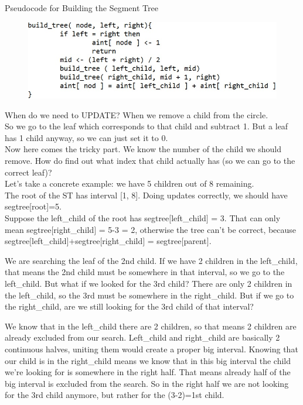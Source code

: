 \documentclass{article}
\begin{document}
Pseudocode for Building the Segment Tree

\begin{figure}[h!]
\includegraphics[scale=0.7]{pseudocod_build_st.jpg}
\end{figure}


When  do  we  need  to  UPDATE?  When  we  remove  a  child  from  the  circle.  
\\So  we  go  to  the  leaf  which  corresponds  to  that  child  and  subtract  1.  But  a  leaf  has  1  child  anyway,  so  we  can  just  set  it  to  0.  
\\Now  here  comes  the  tricky  part.  We  know  the  number  of  the  child  we  should  remove.  How  do  find  out  what  index  that  child  actually  has  (so  we  can  go  to  the  correct  leaf)?   
\\Let’s  take  a  concrete  example:  we  have  5  children  out  of  8  remaining.  
\\The  root  of  the  ST  has  interval  [1,  8].  Doing  updates  correctly,  we  should  have  segtree[root]=5.  
\\Suppose  the  left\_child  of  the  root  has  segtree$[$left\_child$]$ = 3. That  can  only  mean  segtree$[$right\_child$]$ = 5-3 = 2,  otherwise  the  tree  can’t  be  correct,  because  segtree$[$left\_child$]$+segtree$[$right\_child$]$ = segtree$[$parent$]$.


We  are  searching  the  leaf  of  the  2nd  child.  If  we  have  2  children  in  the  left\_child,  that  means  the  2nd  child  must  be  somewhere  in  that  interval,  so  we  go  to  the  left\_child.  But  what  if  we  looked  for  the  3rd  child?  There  are  only  2  children  in  the  left\_child,  so  the  3rd  must  be  somewhere  in  the  right\_child.  But if we go to the  right\_child,  are  we  still  looking  for  the  3rd  child  of  that  interval?  


We  know  that  in  the  left\_child  there  are  2  children,  so  that  means  2  children  are  already  excluded  from  our  search.  Left\_child  and  right\_child  are  basically  2  continuous  halves,  uniting  them  would  create  a  proper  big  interval.  Knowing  that  our  child  is  in  the  right\_child  means  we  know  that  in  this  big  interval  the  child  we’re  looking  for  is  somewhere  in  the  right  half.  That  means  already  half  of  the  big  interval  is  excluded  from  the  search.  So  in  the  right  half  we  are  not  looking  for  the  3rd  child  anymore,  but  rather  for  the  (3-2)=1st  child. 
\end{document}
